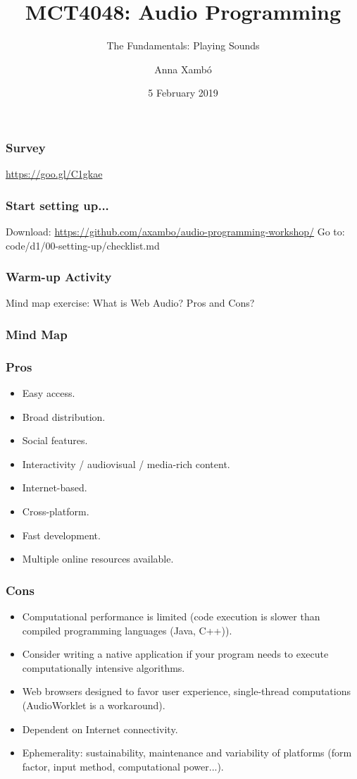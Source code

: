 \documentclass[screen, aspectratio=43]{beamer}
\title[AP-intro]{MCT4048: Audio Programming}
\subtitle{The Fundamentals: Playing Sounds}
\author[A. Xamb{\'o}]{Anna Xamb{\'o}}
\institute[NTNU]{Department of Music, NTNU}
\date{5 February 2019}
\begin{document}
\begin{frame}
  \titlepage
\end{frame}


\begin{frame}
\frametitle{Survey}
\url{https://goo.gl/C1gkae}
\end{frame}
%
\begin{frame}
\frametitle{Start setting up...}
Download: \url{https://github.com/axambo/audio-programming-workshop/} 
\vspace{10 mm}
Go to: \textrm{code/d1/00-setting-up/checklist.md}
\end{frame}
%
\begin{frame}
\frametitle{Warm-up Activity}
Mind map exercise: What is Web Audio? Pros and Cons?
\end{frame}
%
\begin{frame}
\frametitle{Mind Map}
\end{frame}
%
\begin{frame}
\frametitle{Pros}
\begin{itemize}
\item Easy access.
\item Broad distribution.
\item Social features.
\item Interactivity / audiovisual / media-rich content.
\item Internet-based.
\item Cross-platform.
\item Fast development.
\item Multiple online resources available.
\end{itemize}
\end{frame}
%
\begin{frame}
\frametitle{Cons}
\begin{itemize}
\item Computational performance is limited (code execution is slower than compiled programming languages (Java, C++)).
\item Consider writing a native application if your program needs to execute computationally intensive algorithms.
\item Web browsers designed to favor user experience, single-thread computations (AudioWorklet is a workaround).
\item Dependent on Internet connectivity.
\item Ephemerality: sustainability, maintenance and variability of platforms (form factor, input method, computational power...).
\end{itemize}
\end{frame}
\end{document}
